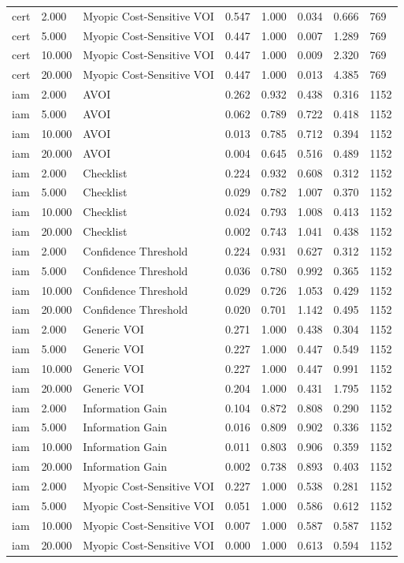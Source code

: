 \begin{table}[!ht]
{\begin{tabular}{llllllll}
cert & 2.000 & Myopic Cost-Sensitive VOI & 0.547 & 1.000 & 0.034 & 0.666 & 769 \\
cert & 5.000 & Myopic Cost-Sensitive VOI & 0.447 & 1.000 & 0.007 & 1.289 & 769 \\
cert & 10.000 & Myopic Cost-Sensitive VOI & 0.447 & 1.000 & 0.009 & 2.320 & 769 \\
cert & 20.000 & Myopic Cost-Sensitive VOI & 0.447 & 1.000 & 0.013 & 4.385 & 769 \\
iam & 2.000 & AVOI & 0.262 & 0.932 & 0.438 & 0.316 & 1152 \\
iam & 5.000 & AVOI & 0.062 & 0.789 & 0.722 & 0.418 & 1152 \\
iam & 10.000 & AVOI & 0.013 & 0.785 & 0.712 & 0.394 & 1152 \\
iam & 20.000 & AVOI & 0.004 & 0.645 & 0.516 & 0.489 & 1152 \\
iam & 2.000 & Checklist & 0.224 & 0.932 & 0.608 & 0.312 & 1152 \\
iam & 5.000 & Checklist & 0.029 & 0.782 & 1.007 & 0.370 & 1152 \\
iam & 10.000 & Checklist & 0.024 & 0.793 & 1.008 & 0.413 & 1152 \\
iam & 20.000 & Checklist & 0.002 & 0.743 & 1.041 & 0.438 & 1152 \\
iam & 2.000 & Confidence Threshold & 0.224 & 0.931 & 0.627 & 0.312 & 1152 \\
iam & 5.000 & Confidence Threshold & 0.036 & 0.780 & 0.992 & 0.365 & 1152 \\
iam & 10.000 & Confidence Threshold & 0.029 & 0.726 & 1.053 & 0.429 & 1152 \\
iam & 20.000 & Confidence Threshold & 0.020 & 0.701 & 1.142 & 0.495 & 1152 \\
iam & 2.000 & Generic VOI & 0.271 & 1.000 & 0.438 & 0.304 & 1152 \\
iam & 5.000 & Generic VOI & 0.227 & 1.000 & 0.447 & 0.549 & 1152 \\
iam & 10.000 & Generic VOI & 0.227 & 1.000 & 0.447 & 0.991 & 1152 \\
iam & 20.000 & Generic VOI & 0.204 & 1.000 & 0.431 & 1.795 & 1152 \\
iam & 2.000 & Information Gain & 0.104 & 0.872 & 0.808 & 0.290 & 1152 \\
iam & 5.000 & Information Gain & 0.016 & 0.809 & 0.902 & 0.336 & 1152 \\
iam & 10.000 & Information Gain & 0.011 & 0.803 & 0.906 & 0.359 & 1152 \\
iam & 20.000 & Information Gain & 0.002 & 0.738 & 0.893 & 0.403 & 1152 \\
iam & 2.000 & Myopic Cost-Sensitive VOI & 0.227 & 1.000 & 0.538 & 0.281 & 1152 \\
iam & 5.000 & Myopic Cost-Sensitive VOI & 0.051 & 1.000 & 0.586 & 0.612 & 1152 \\
iam & 10.000 & Myopic Cost-Sensitive VOI & 0.007 & 1.000 & 0.587 & 0.587 & 1152 \\
iam & 20.000 & Myopic Cost-Sensitive VOI & 0.000 & 1.000 & 0.613 & 0.594 & 1152 \\
\bottomrule
\end{tabular}}
\end{table}
